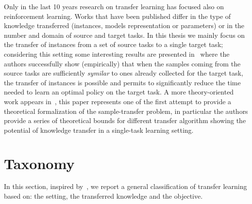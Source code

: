     \noindent Only in the last 10 years research on transfer learning has focused also on reinforcement learning.
    Works that have been published differ in the type of knowledge transferred (instances, models representation or parameters)
    or in the number and domain of source and target tasks. In this thesis we mainly focus on the transfer of instances
    from a set of source tasks to a single target task; considering this setting some interesting results are presented
    in~\cite{lazaric2008transfer} where the authors successfully show (empirically) that when the samples coming from the
    source tasks are sufficiently \textit{symilar} to ones already collected for the target task, the transfer
    of instances is possible and permits to significantly reduce the time needed to learn an optimal
    policy on the target task.\newline
    A more theory-oriented work appears in~\cite{lazaric2011multiple}, this paper represents one of the
    first attempt to provide a theoretical formalization of the sample-transfer problem, in particular
    the authors provide a series of theoretical bounds for different transfer algorithm showing the potential
    of knowledge transfer in a single-task learning setting.

  \section{Taxonomy}
    \noindent In this section, inspired by~\cite{lazaric2012transfer}, we report a general classification of
    transfer learning based on: the setting, the transferred knowledge and the objective.
